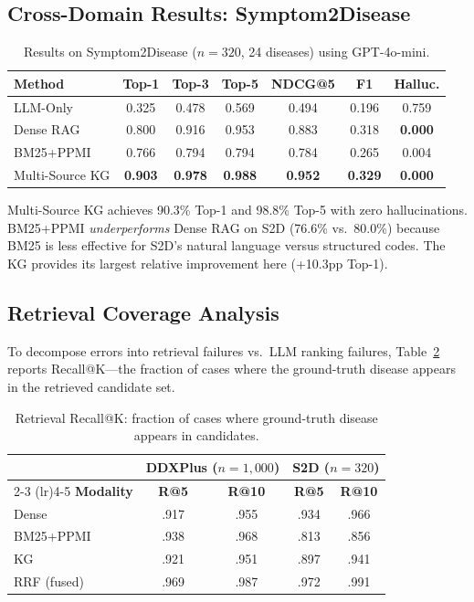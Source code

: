 \documentclass[runningheads]{llncs}
\begin{document}
\subsection{Cross-Domain Results: Symptom2Disease}
\label{sec:cross_domain}

\begin{table}[t]
\centering
\caption{Results on Symptom2Disease ($n{=}320$, 24 diseases) using GPT-4o-mini.}
\label{tab:s2d}
\begin{tabular}{lcccccc}
\toprule
\textbf{Method} & \textbf{Top-1} & \textbf{Top-3} & \textbf{Top-5} & \textbf{NDCG@5} & \textbf{F1} & \textbf{Halluc.} \\
\midrule
LLM-Only       & 0.325 & 0.478 & 0.569 & 0.494 & 0.196 & 0.759 \\
Dense RAG       & 0.800 & 0.916 & 0.953 & 0.883 & 0.318 & \textbf{0.000} \\
BM25+PPMI       & 0.766 & 0.794 & 0.794 & 0.784 & 0.265 & 0.004 \\
Multi-Source KG & \textbf{0.903} & \textbf{0.978} & \textbf{0.988} & \textbf{0.952} & \textbf{0.329} & \textbf{0.000} \\
\bottomrule
\end{tabular}
\end{table}

Multi-Source KG achieves 90.3\% Top-1 and 98.8\% Top-5 with zero hallucinations. BM25+PPMI \emph{underperforms} Dense RAG on S2D (76.6\% vs.\ 80.0\%) because BM25 is less effective for S2D's natural language versus structured codes. The KG provides its largest relative improvement here (+10.3pp Top-1).

\subsection{Retrieval Coverage Analysis}
\label{sec:recall}

To decompose errors into retrieval failures vs.\ LLM ranking failures, Table~\ref{tab:recall} reports Recall@K---the fraction of cases where the ground-truth disease appears in the retrieved candidate set.

\begin{table}[t]
\centering
\caption{Retrieval Recall@K: fraction of cases where ground-truth disease appears in candidates.}
\label{tab:recall}
\begin{tabular}{lcccc}
\toprule
& \multicolumn{2}{c}{\textbf{DDXPlus} ($n{=}1{,}000$)} & \multicolumn{2}{c}{\textbf{S2D} ($n{=}320$)} \\
\cmidrule(lr){2-3} \cmidrule(lr){4-5}
\textbf{Modality} & \textbf{R@5} & \textbf{R@10} & \textbf{R@5} & \textbf{R@10} \\
\midrule
Dense       & .917 & .955 & .934 & .966 \\
BM25+PPMI   & .938 & .968 & .813 & .856 \\
KG          & .921 & .951 & .897 & .941 \\
RRF (fused) & .969 & .987 & .972 & .991 \\
\bottomrule
\end{tabular}
\end{table}
\end{document}
